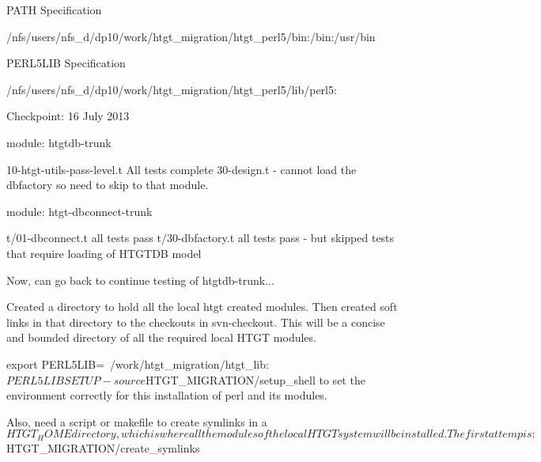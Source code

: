 PATH Specification

/nfs/users/nfs_d/dp10/work/htgt_migration/htgt_perl5/bin:/bin:/usr/bin

PERL5LIB Specification

/nfs/users/nfs_d/dp10/work/htgt_migration/htgt_perl5/lib/perl5:

Checkpoint: 16 July 2013

module: htgtdb-trunk

10-htgt-utils-pass-level.t  All tests complete 
30-design.t - cannot load the dbfactory so need to skip to that module.

module: htgt-dbconnect-trunk

t/01-dbconnect.t all tests pass
t/30-dbfactory.t all tests pass - but skipped tests that require loading of HTGTDB model 


Now, can go back to continue testing of htgtdb-trunk...

Created a directory to hold all the local htgt created modules. Then created soft links in that directory
to the checkouts in svn-checkout. This will be a concise and bounded directory of all the required local
HTGT modules.

export PERL5LIB=~/work/htgt_migration/htgt_lib:$PERL5LIB


SETUP - source  $HTGT_MIGRATION/setup_shell to set the environment correctly for this installation of perl and its modules.

Also, need a script or makefile to create symlinks in a $HTGT_HOME directory, which is where all the
modules of the local HTGT system will be installed.

The first attemp is:

$HTGT_MIGRATION/create_symlinks
